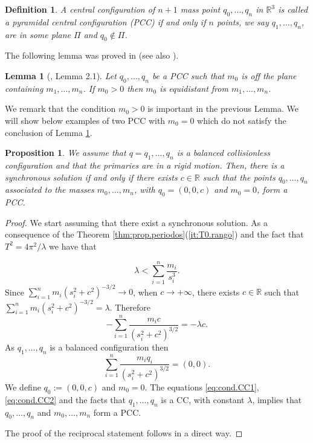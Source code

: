 \documentclass[twoside]{article}
\newtheorem{lem}[thm]{Lemma}
\newtheorem{defi}[thm]{Definition}
\newtheorem{prop}[thm]{Proposition}
\theoremstyle{remark}
\newcommand{\rr}{\mathbb{R}}
\newcounter{example}
\begin{document}
\begin{defi}
A central configuration of $n+1$ mass point $q_0,\ldots,q_{n}$ in $\rr^{3}$  is called a pyramidal central configuration (PCC) if and only if $n$ points, we say $q_1,\ldots,q_n$, are in some plane $\Pi$ and $q_{0}\notin \Pi$.
\end{defi}

The following lemma was proved in \cite{ouyang2004pyramidal} (see also \cite{faycaltesis}).
\begin{lem}[\cite{ouyang2004pyramidal}, Lemma 2.1]\label{lem:PCC}
 Let $q_0,\ldots,q_{n}$ be a PCC such that $m_{0}$ is off the plane containing $m_1,\ldots,m_n$. If $m_{0}>0$ then $m_{0}$ is equidistant from $m_1,\ldots,m_n$.
\end{lem}

We remark that the condition $m_{0}>0$ is important in the previous Lemma. We will show below examples of two PCC with $m_{0}=0$ which do not satisfy the conclusion of  Lemma \ref{lem:PCC}.



\begin{prop}\label{cor:sol.sincronica}
We assume that $q=q_1,\ldots,q_n$ is a balanced collisionless configuration and that the primaries are in a rigid motion. Then, there is a synchronous solution if and only if there exists $c\in \rr$ such that the points $q_0,\ldots,q_{n}$ associated to the masses $m_0,\ldots,m_{n}$, with $q_{0}=(0,0,c)$ and $m_{0}=0$, form a PCC.
\end{prop}

\begin{proof}
We start assuming that there exist a synchronous solution. As a consequence of the Theorem \ref{thm:prop.periodos}(\ref{it:T0.rango}) and the fact that $T^2=4\pi^2/\lambda$ we have that

 \begin{equation}\label{eq:lamdbda<suma.si3}
\lambda<\sum_{i=1}^n\frac{m_i}{s_i^3}.
 \end{equation}
 Since $\sum_{i=1}^{n}m_i\left(s_i^2+c^2\right)^{-3/2}\to 0$, when $c\to +\infty$, there exists $c\in \rr$ such that
 $ \sum_{i=1}^{n}m_i\left(s_i^2+c^2\right)^{-3/2}=\lambda$. Therefore
 \begin{equation}\label{eq:cond.CC1}
  -\sum_{i=1}^{n}\frac{m_i c}{\left(s_i^2+c^2\right)^{3/2}}=-\lambda c.
 \end{equation}
As $q_1,\ldots,q_n$ is a balanced configuration then
\begin{equation}\label{eq:cond.CC2}
   \sum_{i=1}^{n}\frac{m_i q_i}{\left(s_i^2+c^2\right)^{3/2}}= (0,0).
\end{equation}
We define  $q_{0}:=(0,0,c)$ and $m_{0}=0$. The equations \eqref{eq:cond.CC1}, \eqref{eq:cond.CC2}  and the facts that $q_1,\ldots,q_n$ is a CC, with constant $\lambda$,  implies that $q_0,\ldots,q_{n}$ and $m_0,\ldots,m_{n}$  form a PCC.

The proof of the reciprocal statement follows in a direct way.
\end{proof}
\end{document}
